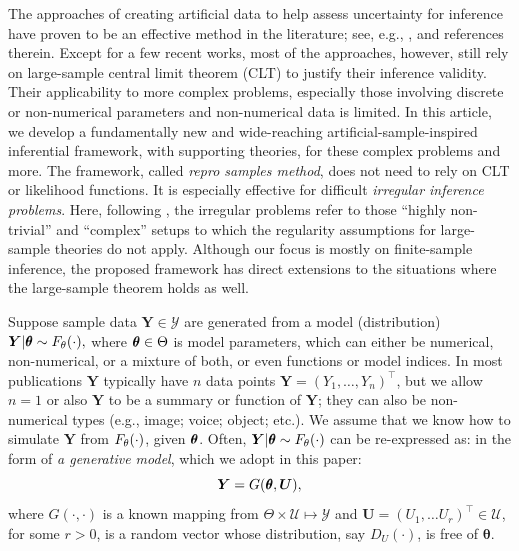 \documentclass[12pt]{article}
\theoremstyle{shortspace}
\def\*#1{\bm{#1}}
\def\btheta{\mathop{\theta\kern-.45em\hbox{$\theta$}}\nolimits}
\begin{document}
The approaches of 
creating 
artificial data to
help assess uncertainty  
for inference have proven to be an effective method in the literature; 
see, e.g., \citet{EfroTibs93,
fishman1996, 
Robert2016, Hannig2016, dalmasso2022}, 
 and references therein. Except for a few recent works, 
most of the approaches, however, still rely on large-sample central limit theorem (CLT)
to justify their inference validity.
Their applicability to more complex problems, especially those involving discrete or non-numerical parameters and non-numerical data 
is limited. 
In this article, we 
develop a fundamentally new 
and wide-reaching artificial-sample-inspired inferential framework, with 
supporting theories, 
for these complex problems and more.
The %
framework, called {\it repro samples method}, does not need to rely on CLT or likelihood functions.
It is especially effective for difficult {\it irregular inference problems}.
Here, following \cite{wasserman2020universal}, the irregular problems refer to those ``highly non-trivial''  and ``complex'' setups to which the regularity assumptions for large-sample theories do not apply. 
Although our focus is mostly on finite-sample inference, the 
proposed framework
has direct extensions to the situations where the large-sample theorem holds as well. 

Suppose sample data $\*Y \in {\mathcal Y}$ 
are generated from a model (distribution) 
$
\*Y | {\btheta} \sim F_{{\bf \theta}}(\cdot),$ 
where
${\btheta} \in \Theta$ is model parameters, which can either be numerical, non-numerical, or a mixture of both, or even functions or model indices. 
In most publications $\*Y$ typically have $n$ data points $\*Y= (Y_1, \ldots, Y_n)^\top$, but we 
allow $n=1$ or also $\*Y$ to be a summary or function of $\*Y$; they can also be non-numerical types (e.g., image; voice; object; etc.). 
We assume that we know how to simulate $\*Y$ from $F_{\bf \theta}(\cdot)$, given $\btheta$. 
Often,  $\*Y | {\btheta} \sim F_{{\bf \theta}}(\cdot)$ 
can be re-expressed as:
in the form of {\it a generative 
model}, which we adopt in this paper:
\begin{equation}\label{eq:1}
\*Y = G({\btheta}, \*U), 
\end{equation} 
where $G(\cdot, \cdot)$ is a known mapping from $\Theta \times {\mathcal U} \mapsto {\mathcal Y}$ and $\*U = (U_1, \ldots U_r)^\top \in {\mathcal U}$,  for some $r >0$, 
is a random vector 
whose distribution, say $D_U(\cdot)$, is free of $\*\theta$.
\end{document}
